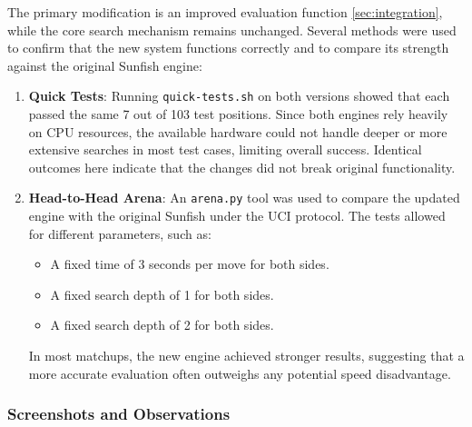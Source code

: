 \documentclass[12pt,a4paper]{article}
\begin{document}
The primary modification is an improved evaluation function \ref{sec:integration}, while the core search mechanism remains unchanged. Several methods were used to confirm that the new system functions correctly and to compare its strength against the original Sunfish engine:

\begin{enumerate}
\item \textbf{Quick Tests}: Running \texttt{quick-tests.sh} on both versions showed that each passed the same 7 out of 103 test positions. Since both engines rely heavily on CPU resources, the available hardware could not handle deeper or more extensive searches in most test cases, limiting overall success. Identical outcomes here indicate that the changes did not break original functionality.

\item \textbf{Head-to-Head Arena}: An \texttt{arena.py} tool was used to compare the updated engine with the original Sunfish under the UCI protocol. The tests allowed for different parameters, such as:
\begin{itemize}
    \item A fixed time of 3 seconds per move for both sides.
    \item A fixed search depth of 1 for both sides.
    \item A fixed search depth of 2 for both sides.
\end{itemize}
In most matchups, the new engine achieved stronger results, suggesting that a more accurate evaluation often outweighs any potential speed disadvantage.
\end{enumerate}

\subsubsection{Screenshots and Observations}
\end{document}
